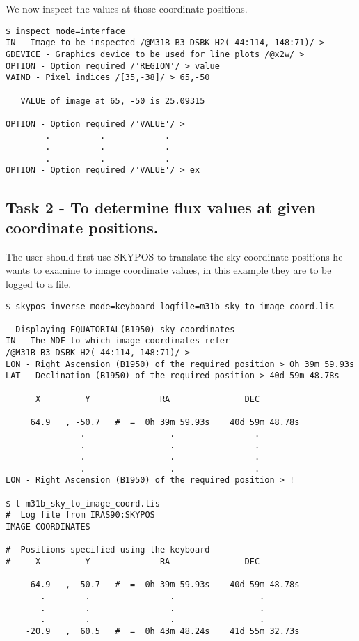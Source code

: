 \documentclass[twoside,11pt]{article}
\begin{document}
We now inspect the values at those coordinate positions.
\begin{small}
\begin{verbatim}
$ inspect mode=interface
IN - Image to be inspected /@M31B_B3_DSBK_H2(-44:114,-148:71)/ > 
GDEVICE - Graphics device to be used for line plots /@x2w/ > 
OPTION - Option required /'REGION'/ > value
VAIND - Pixel indices /[35,-38]/ > 65,-50

   VALUE of image at 65, -50 is 25.09315

OPTION - Option required /'VALUE'/ > 
        .          .            .
        .          .            .
        .          .            .
OPTION - Option required /'VALUE'/ > ex
\end{verbatim}
\end{small}
\subsection {Task 2  - To determine flux values at given coordinate positions.}
\label{a:exkappa2}
The user should first use SKYPOS to translate the sky coordinate positions he
wants to examine to image coordinate values, in this example they are to be
logged to a file.
\begin{small}
\begin{verbatim}
$ skypos inverse mode=keyboard logfile=m31b_sky_to_image_coord.lis

  Displaying EQUATORIAL(B1950) sky coordinates
IN - The NDF to which image coordinates refer /@M31B_B3_DSBK_H2(-44:114,-148:71)/ > 
LON - Right Ascension (B1950) of the required position > 0h 39m 59.93s
LAT - Declination (B1950) of the required position > 40d 59m 48.78s

      X         Y              RA               DEC

     64.9   , -50.7   #  =  0h 39m 59.93s    40d 59m 48.78s
               .                 .                .
               .                 .                .
               .                 .                .
               .                 .                .
LON - Right Ascension (B1950) of the required position > !

$ t m31b_sky_to_image_coord.lis
#  Log file from IRAS90:SKYPOS
IMAGE COORDINATES
 
#  Positions specified using the keyboard
#     X         Y              RA               DEC 
 
     64.9   , -50.7   #  =  0h 39m 59.93s    40d 59m 48.78s  
       .        .                .                 .
       .        .                .                 .
       .        .                .                 .
    -20.9   ,  60.5   #  =  0h 43m 48.24s    41d 55m 32.73s

\end{verbatim}
\end{small}
\end{document}
